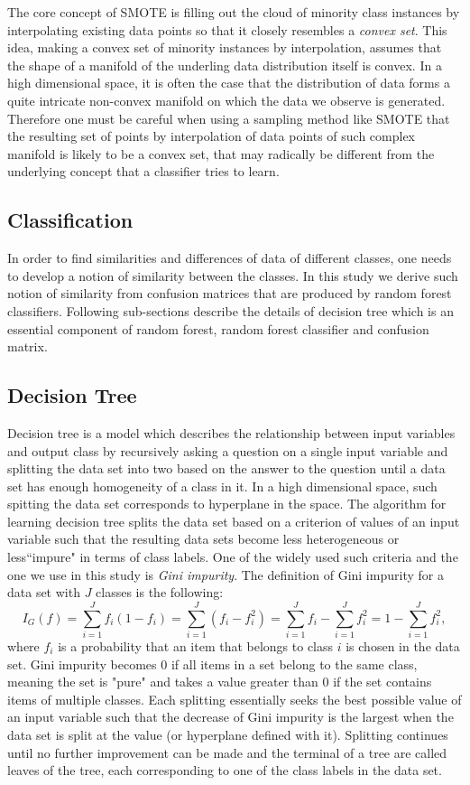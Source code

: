 The core concept of SMOTE is filling out the cloud of minority class instances by interpolating existing data points so that it closely resembles a \textit{convex set}. This idea, making a convex set of minority instances by interpolation, assumes that the shape of a manifold of the underling data distribution itself is convex. In a high dimensional space, it is often the case that the distribution of data forms a quite intricate non-convex manifold on which the data we observe is generated. Therefore one must be careful when using a sampling method like SMOTE that the resulting set of points by interpolation of data points of such complex manifold is likely to be a convex set, that may radically be different from the underlying concept that a classifier tries to learn.

	\subsection*{Classification}
	In order to find similarities and differences of data of different classes, one needs to develop a notion of similarity between the classes. In this study we derive such notion of similarity from confusion matrices that are produced by random forest classifiers. Following sub-sections describe the details of decision tree which is an essential component of random forest, random forest classifier and confusion matrix.
	
		\subsection{Decision Tree}
		Decision tree is a model which describes the relationship between input variables and output class by recursively asking a question on a single input variable and splitting the data set into two based on the answer to the question until a data set has enough homogeneity of a class in it. In a high dimensional space, such spitting the data set corresponds to hyperplane in the space. The algorithm for learning decision tree splits the data set based on a criterion of values of an input variable such that the resulting data sets become less heterogeneous or less``impure" in terms of class labels. One of the widely used such criteria and the one we use in this study is \textit{Gini impurity}. The definition of Gini impurity for a data set with $J$ classes is the following:
	\begin{equation}
	I_G(f) = \sum_{i=1}^J f_i(1-f_i) = \sum_{i=1}^J (f_i-f_i^2) =  \sum_{i=1}^J f_i - \sum_{i=1}^J f_i^2 = 1- \sum_{i=1}^J f_i^2,
	\end{equation}
where $f_i$ is a probability that an item that belongs to class $i$ is chosen in the data set. Gini impurity becomes $0$ if all items in a set belong to the same class, meaning the set is "pure" and takes a value greater than $0$ if the set contains items of multiple classes. Each splitting essentially seeks the best possible value of an input variable such that the decrease of Gini impurity is the largest when the data set is split at the value (or hyperplane defined with it). Splitting continues until no further improvement can be made and the terminal of a tree are called leaves of the tree, each corresponding to one of the class labels in the data set.
		
